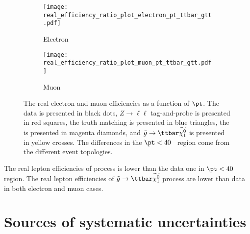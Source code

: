 %
\begin{figure}[htbp]
    \begin{subfigure}[b]{0.48\textwidth}
        \begin{center}
            \texttt{[image: real\_efficiency\_ratio\_plot\_electron\_pt\_ttbar\_gtt.pdf]}
            \caption{Electron}
        \end{center}
    \end{subfigure}
    \begin{subfigure}[b]{0.48\textwidth}
        \begin{center}
            \texttt{[image: real\_efficiency\_ratio\_plot\_muon\_pt\_ttbar\_gtt.pdf]}
            \caption{Muon}
        \end{center}
    \end{subfigure}
    \caption{The real electron and muon efficiencies as a function of $\pt$.
    The data is presented in black dots,  $Z\to \ell\ell$ tag-and-probe is presented in red squares, the truth matching is presented in blue triangles, the \ttbar is presented in magenta diamonds, and $\tilde{g} \to \ttbar \widetilde{\chi^{0}_{1}}$ is presented in yellow crosses.
    The differences in the $\pt < 40$~{\GeV} region come from the different event topologies.}
    \label{fig:app_RLE_real_efficiency_ttbar_gtt}
\end{figure}
%
The real lepton efficiencies of \ttbar process is lower than the data one in $\pt < 40$~{\GeV} region.
The real lepton efficiencies of $\tilde{g} \to \ttbar \widetilde{\chi^{0}_{1}}$ process are lower than data in both electron and muon cases.


\section{Sources of systematic uncertainties}
\label{sec:app_RLE_sources_of_systematic_uncertainties}


